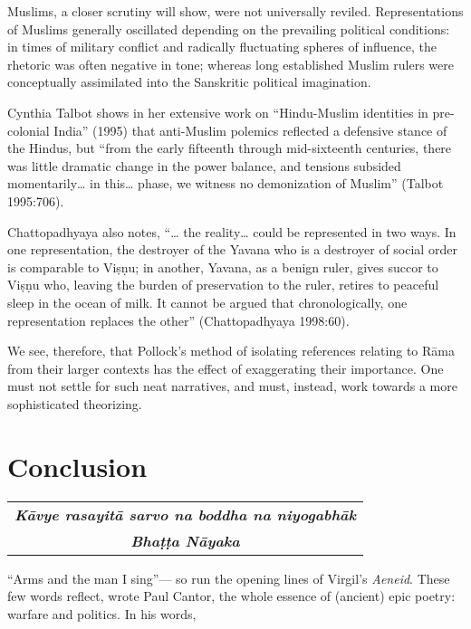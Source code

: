 Muslims, a closer scrutiny will show, were not universally reviled. Representations of Muslims generally oscillated depending on the prevailing political conditions: in times of military conflict and radically fluctuating spheres of influence, the rhetoric was often negative in tone; whereas long established Muslim rulers were conceptually assimilated into the Sanskritic political imagination. 

Cynthia Talbot shows in her extensive work on “Hindu-Muslim identities in pre-colonial India” (1995) that anti-Muslim polemics reflected a defensive stance of the Hindus, but “from the early fifteenth through mid-sixteenth centuries, there was little dramatic change in the power balance, and tensions subsided momentarily… in this… phase, we witness no demonization of Muslim” (Talbot 1995:706). 

Chattopadhyaya also notes, “… the reality… could be represented in two ways. In one representation, the destroyer of the Yavana who is a destroyer of social order is comparable to Viṣṇu; in another, Yavana, as a benign ruler, gives succor to Viṣṇu who, leaving the burden of preservation to the ruler, retires to peaceful sleep in the ocean of milk. It cannot be argued that chronologically, one representation replaces the other” (Chattopadhyaya 1998:60). 

We see, therefore, that Pollock’s method of isolating references relating to Rāma from their larger contexts has the effect of exaggerating their importance. One must not settle for such neat narratives, and must, instead, work towards a more sophisticated theorizing. 


\section*{Conclusion}

\medskip
\begin{flushright}
\begin{tabular}{c@{}}
{\sl\bfseries Kāvye rasayitā sarvo na boddha na niyogabhāk}\\[3pt]
{\sl\bfseries  Bhaṭṭa Nāyaka}\index{Bhatta Nayaka@Bhaṭṭa Nāyaka}
\end{tabular}
\end{flushright}


“Arms and the man I sing”— so run the opening lines of Virgil’s {\sl Aeneid}. These few words reflect, wrote Paul Cantor, the whole essence of (ancient) epic poetry: warfare and politics. In his words, 

